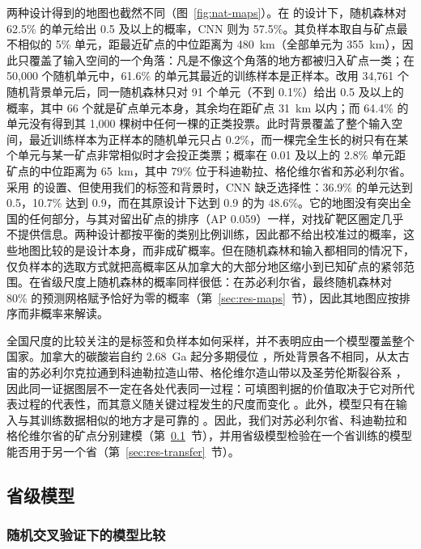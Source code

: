 \documentclass[pdflatex,sn-apa]{sn-jnl}
\begin{document}
两种设计得到的地图也截然不同（图~\ref{fig:nat-maps}）。在 \citet{Parsa2024} 的设计下，随机森林对 62.5\% 的单元给出 0.5 及以上的概率，CNN 则为 57.5\%。其负样本取自与矿点最不相似的 5\% 单元，距最近矿点的中位距离为 480~km（全部单元为 355~km），因此只覆盖了输入空间的一个角落：凡是不像这个角落的地方都被归入矿点一类；在 50,000 个随机单元中，61.6\% 的单元其最近的训练样本是正样本。改用 34,761 个随机背景单元后，同一随机森林只对 91 个单元（不到 0.1\%）给出 0.5 及以上的概率，其中 66 个就是矿点单元本身，其余均在距矿点 31~km 以内；而 64.4\% 的单元没有得到其 1,000 棵树中任何一棵的正类投票。此时背景覆盖了整个输入空间，最近训练样本为正样本的随机单元只占 0.2\%，而一棵完全生长的树只有在某个单元与某一矿点非常相似时才会投正类票；概率在 0.01 及以上的 2.8\% 单元距矿点的中位距离为 65~km，其中 79\% 位于科迪勒拉、格伦维尔省和苏必利尔省。采用 \citet{Parsa2024} 的设置、但使用我们的标签和背景时，CNN 缺乏选择性：36.9\% 的单元达到 0.5，10.7\% 达到 0.9，而在其原设计下达到 0.9 的为 48.6\%。它的地图没有突出全国的任何部分，与其对留出矿点的排序（AP 0.059）一样，对找矿靶区圈定几乎不提供信息。两种设计都按平衡的类别比例训练，因此都不给出校准过的概率，这些地图比较的是设计本身，而非成矿概率。但在随机森林和输入都相同的情况下，仅负样本的选取方式就把高概率区从加拿大的大部分地区缩小到已知矿点的紧邻范围。在省级尺度上随机森林的概率同样很低：在苏必利尔省，最终随机森林对 80\% 的预测网格赋予恰好为零的概率（第~\ref{sec:res-maps}~节），因此其地图应按排序而非概率来解读。

全国尺度的比较关注的是标签和负样本如何采样，并不表明应由一个模型覆盖整个国家。加拿大的碳酸岩自约 2.68~Ga 起分多期侵位 \citep{Rukhlov2010}，所处背景各不相同，从太古宙的苏必利尔克拉通到科迪勒拉造山带、格伦维尔造山带以及圣劳伦斯裂谷系 \citep{Groulier2020,Neron2018}，因此同一证据图层不一定在各处代表同一过程：可填图判据的价值取决于它对所代表过程的代表性，而其意义随关键过程发生的尺度而变化 \citep{McCuaig2010}。此外，模型只有在输入与其训练数据相似的地方才是可靠的 \citep{Meyer2021}。因此，我们对苏必利尔省、科迪勒拉和格伦维尔省的矿点分别建模（第~\ref{sec:res-provinces}~节），并用省级模型检验在一个省训练的模型能否用于另一个省（第~\ref{sec:res-transfer}~节）。

\subsection{省级模型}\label{sec:res-provinces}

\subsubsection{随机交叉验证下的模型比较}\label{sec:res-random}
\end{document}
